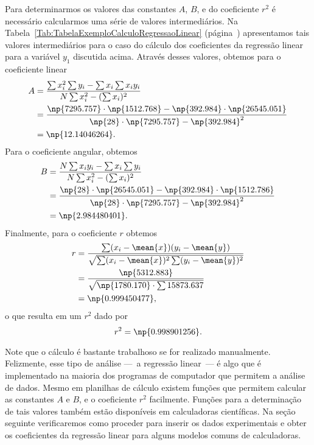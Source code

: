 Para determinarmos os valores das constantes $A$, $B$, e do coeficiente $r^2$ é necessário calcularmos uma série de valores intermediários. Na Tabela~\ref{Tab:TabelaExemploCalculoRegressaoLinear} (página~\pageref{Tab:TabelaExemploCalculoRegressaoLinear}) apresentamos tais valores intermediários para o caso do cálculo dos coeficientes da regressão linear para a variável $y_1$ discutida acima. Através desses valores, obtemos para o coeficiente linear
\begin{align}
    A &= \frac{\sum x_i^2 \sum y_i - \sum x_i \sum x_iy_i}{N \sum x_i^2 - (\sum x_i)^2} \\
    &= \frac{\np{7295.757} \cdot \np{1512.768} - \np{392.984} \cdot \np{26545.051}}{\np{28}\cdot\np{7295.757} - \np{392.984}^2} \\
    &= \np{12.14046264}.
\end{align}
%
Para o coeficiente angular, obtemos
\begin{align}
    B &= \frac{N\sum x_iy_i - \sum x_i \sum y_i}{N \sum x_i^2 - (\sum x_i)^2} \\
    &= \frac{\np{28} \cdot \np{26545.051} - \np{392.984}\cdot\np{1512.786}}{\np{28}\cdot\np{7295.757} - \np{392.984}^2} \\
    &= \np{2.984480401}.
\end{align}
%
Finalmente, para o coeficiente $r$ obtemos
\begin{align}
    r &= \frac{\sum (x_i - \mean{x})(y_i-\mean{y})}{\sqrt{\sum(x_i - \mean{x})^2\sum (y_i - \mean{y})^2}} \\
    &= \frac{\np{5312.883}}{\sqrt{\np{1780.170}\cdot\sum{15873.637}}} \\
    &= \np{0.999450477},
\end{align}
%
o que resulta em um $r^2$ dado por
\begin{equation}
    r^2 = \np{0.998901256}.
\end{equation}

Note que o cálculo é bastante trabalhoso se for realizado manualmente. Felizmente, esse tipo de análise ---~a regressão linear~--- é algo que é implementado na maioria dos programas de computador que permitem a análise de dados. Mesmo em planilhas de cálculo existem funções que permitem calcular as constantes $A$ e $B$, e o coeficiente $r^2$ facilmente. Funções para a determinação de tais valores também estão disponíveis em calculadoras científicas. Na seção seguinte verificaremos como proceder para inserir os dados experimentais e obter os coeficientes da regressão linear para alguns modelos comuns de calculadoras. 


